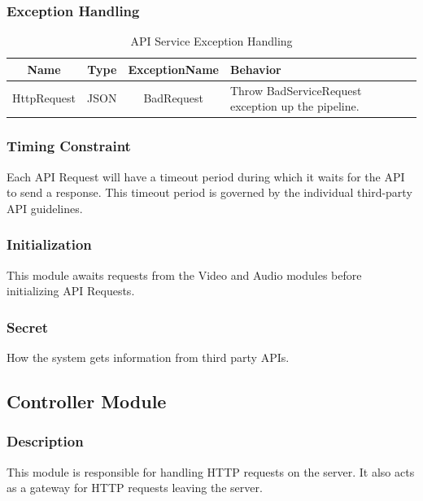 \documentclass{article}
\begin{document}
\subsubsection{Exception Handling}
\begin{table}[H]
    \caption{API Service Exception Handling}
    \centering
    \begin{tabularx}{0.7\textwidth}{|c|c|c|X|} \hline
        \textbf{Name} & \textbf{Type} & \textbf{ExceptionName} & \textbf{Behavior} \\ \hline
        HttpRequest & JSON & BadRequest & Throw BadServiceRequest exception up the pipeline. \\ \hline
    \end{tabularx}
    \label{tab:API_Service_Exception}
\end{table}

\subsubsection{Timing Constraint}
Each API Request will have a timeout period during which it waits for the API to send a response. This timeout period is governed by the individual third-party API guidelines.

\subsubsection{Initialization}
This module awaits requests from the Video and Audio modules before initializing API Requests.

\subsubsection{Secret}
How the system gets information from third party APIs.

\subsection{Controller Module}

\subsubsection{Description}
This module is responsible for handling HTTP requests on the server. It also acts as a gateway for HTTP requests leaving the server. 
\end{document}
